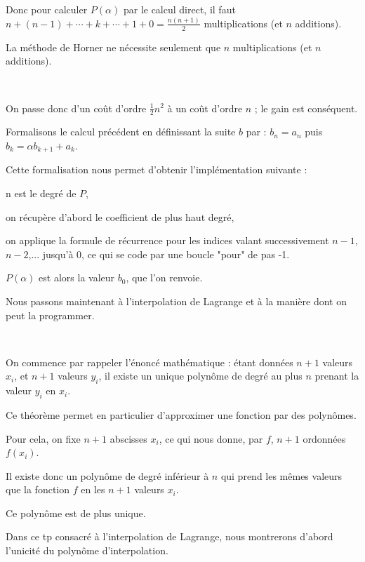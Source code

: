 Donc pour calculer
$P(\alpha)$ par le calcul direct, il faut $n+(n-1)+\cdots+k+\cdots+1+0 = \frac{n(n+1)}{2}$ multiplications (et $n$ additions).

\change
La méthode de Horner 
       ne nécessite seulement que $n$ multiplications (et $n$ additions). 

~

On passe donc d'un coût d'ordre $\frac12n^2$ à un coût d'ordre $n$ ; le gain est conséquent.%

\change
    Formalisons le calcul précédent en définissant la suite $b$ par : $b_{n} = a_n$ puis
 $b_{k} = \alpha b_{k+1}  + a_k$.
 
\change
Cette formalisation nous permet d'obtenir l'implémentation suivante : 

  n est le degré de $P$,
  
  on récupère d'abord le coefficient de plus haut degré,
  
  on applique la formule de récurrence pour les indices valant successivement $n-1$, $n-2$,... jusqu'à $0$, ce qui se code par une boucle "pour" de pas -1.

$P(\alpha)$ est alors la valeur $b_0$, que l'on renvoie.




\diapo

Nous passons maintenant à l'interpolation de Lagrange et à la manière dont on peut la programmer.

~

On commence par rappeler l'énoncé mathématique : étant données $n+1$ valeurs $x_i$, et $n+1$ valeurs $y_i$, il existe un unique polynôme de degré au plus $n$ prenant la valeur $y_i$ en $x_i$.

\change
Ce théorème permet en particulier d'approximer une fonction par des polynômes.

Pour cela, on fixe $n+1$ abscisses $x_i$, ce qui nous donne, par $f$, $n+1$ ordonnées $f(x_i)$.

Il existe donc un polynôme de degré inférieur à $n$ qui prend les mêmes valeurs que la fonction $f$ en les $n+1$ valeurs $x_i$. 

Ce polynôme est de plus unique.



\diapo

Dans ce tp consacré à l'interpolation de Lagrange, nous montrerons d'abord l'unicité du polynôme d'interpolation.

